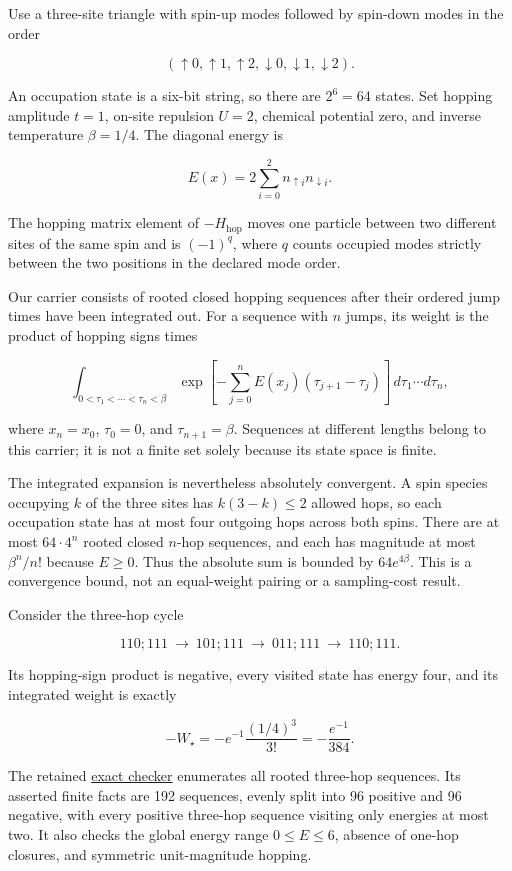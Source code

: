 \documentclass[
  11pt,
]{article}
\begin{document}
Use a three-site triangle with spin-up modes followed by spin-down modes
in the order

\[
(\uparrow0,\uparrow1,\uparrow2,\downarrow0,\downarrow1,\downarrow2).
\]

An occupation state is a six-bit string, so there are \(2^6=64\) states.
Set hopping amplitude \(t=1\), on-site repulsion \(U=2\), chemical
potential zero, and inverse temperature \(\beta=1/4\). The diagonal
energy is

\[
E(x)=2\sum_{i=0}^{2}n_{\uparrow i}n_{\downarrow i}.
\]

The hopping matrix element of \(-H_{\mathrm{hop}}\) moves one particle
between two different sites of the same spin and is \((-1)^q\), where
\(q\) counts occupied modes strictly between the two positions in the
declared mode order.

Our carrier consists of rooted closed hopping sequences after their
ordered jump times have been integrated out. For a sequence with \(n\)
jumps, its weight is the product of hopping signs times

\[
\int_{0<\tau_1<\cdots<\tau_n<\beta}
\exp\!\left[-\sum_{j=0}^{n} E(x_j)(\tau_{j+1}-\tau_j)\right]
\,d\tau_1\cdots d\tau_n,
\]

where \(x_n=x_0\), \(\tau_0=0\), and \(\tau_{n+1}=\beta\). Sequences at
different lengths belong to this carrier; it is not a finite set solely
because its state space is finite.

The integrated expansion is nevertheless absolutely convergent. A spin
species occupying \(k\) of the three sites has \(k(3-k)\leq2\) allowed
hops, so each occupation state has at most four outgoing hops across
both spins. There are at most \(64\cdot4^n\) rooted closed \(n\)-hop
sequences, and each has magnitude at most \(\beta^n/n!\) because
\(E\geq0\). Thus the absolute sum is bounded by \(64e^{4\beta}\). This
is a convergence bound, not an equal-weight pairing or a sampling-cost
result.

Consider the three-hop cycle

\[
110;111\ \longrightarrow\ 101;111\
\longrightarrow\ 011;111\ \longrightarrow\ 110;111.
\]

Its hopping-sign product is negative, every visited state has energy
four, and its integrated weight is exactly

\[
-W_\star=-e^{-1}\frac{(1/4)^3}{3!}
=-\frac{e^{-1}}{384}.
\]

The retained
\href{https://github.com/dbccpage/the_symbol_game/blob/main/omega_engine_education/documentation/030_pfp_proposal_fidelity_protocol_pfp/papers/omega_engine_symbol_game/002_pfp_signed_presentations_and_search_frontier/code/exact_fock_gap.py}{exact
checker} enumerates all rooted three-hop sequences. Its asserted finite
facts are 192 sequences, evenly split into 96 positive and 96 negative,
with every positive three-hop sequence visiting only energies at most
two. It also checks the global energy range \(0\leq E\leq6\), absence of
one-hop closures, and symmetric unit-magnitude hopping.
\end{document}

